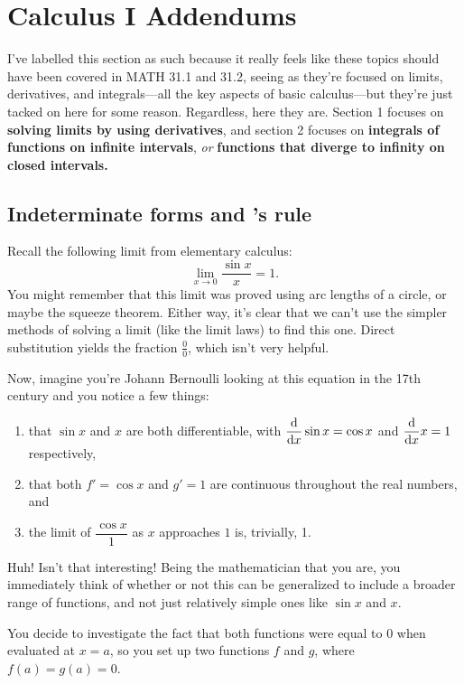 \chapter{Calculus I Addendums}
I've labelled this section as such because it really feels like these topics should have been covered in MATH 31.1 and 31.2, seeing as they're focused on
limits, derivatives, and integrals---all the key aspects of basic calculus---but they're just tacked on here for some reason. Regardless, here they are.
Section 1 focuses on \textbf{solving limits by using derivatives}, and section 2 focuses on \textbf{integrals of functions on infinite intervals}, \textit{or}
\textbf{functions that diverge to infinity on closed intervals.}  

\section{Indeterminate forms and \lh's rule} 
Recall the following limit from elementary calculus:\[
    \lim_{x\to 0 } \frac{\sin x}{x} = 1. 
\] You might remember that this limit was proved using arc lengths of a circle, or maybe the squeeze theorem. Either way, it's clear that we can't use
the simpler methods of solving a limit (like the limit laws) to find this one. Direct substitution yields the fraction \(\frac{0}{0}\), which isn't very helpful.\par 
Now, imagine you're Johann Bernoulli looking at this equation in the 17th century and you notice a few things:\begin{enumerate}
    \item that \(\sin x\) and \(x\) are both differentiable, with \(
        \dfrac{\mathrm{d} }{\mathrm{d} x} \sin x = \cos x \) and \( \dfrac{\mathrm{d} }{\mathrm{d} x} x = 1 
    \) respectively,
    \item that both \(f' = \cos x\) and \(g' = 1\) are continuous throughout the real numbers, and 
    \item the limit of \(\dfrac{\cos x}{1}\) as \(x\) approaches \(1\) is, trivially, 1. 
\end{enumerate} 
Huh! Isn't that interesting! Being the mathematician that you are, you immediately think of whether or not this can be generalized to include a broader range 
of functions, and not just relatively simple ones like \(\sin x\) and \(x\).\par 
You decide to investigate the fact that both functions were equal to 0 when evaluated at \(x = a\), so you set up two functions \(f\) and \(g\), where \(f(a) = g(a) = 0\). 
